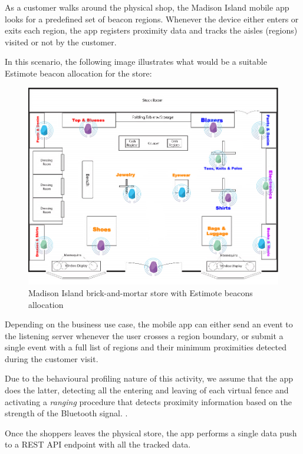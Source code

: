 As a customer walks around the physical shop, the Madison Island mobile app looks for a predefined set of beacon regions. Whenever the device either enters or exits each region, the app registers proximity data and tracks the aisles (regions) visited or not by the customer.

In this scenario, the following image illustrates what would be a suitable Estimote beacon allocation for the store:

\vspace{0.5cm}
\begin{figure}[H]
  \centering
    \includegraphics[width=14cm]{images/madison/retail-map-beacon.jpg}
  \caption{Madison Island brick-and-mortar store with Estimote beacons allocation}
  \label{fig:beacons-map}
\end{figure}
\vspace{0.5cm}

Depending on the business use case, the mobile app can either send an event to the listening server whenever the user crosses a region boundary, or submit a single event with a full list of regions and their minimum proximities detected during the customer visit. 

Due to the behavioural profiling nature of this activity, we assume that the app does the latter, detecting all the entering and leaving of each virtual fence and activating a \textit{ranging} procedure that detects proximity information based on the strength of the Bluetooth signal. \cite{region-monitoring-apple}.

Once the shoppers leaves the physical store, the app performs a single data push to a REST API endpoint with all the tracked data.

